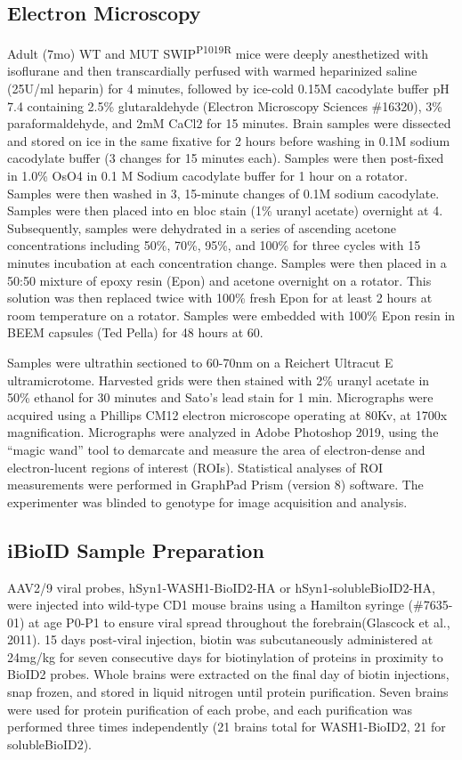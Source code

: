 \subsection{Electron Microscopy}

Adult (7mo) WT and MUT SWIP\textsuperscript{P1019R} mice were deeply
anesthetized with isoflurane and then transcardially perfused with warmed
heparinized saline (25U/ml heparin) for 4 minutes, followed by ice-cold 0.15M
cacodylate buffer pH 7.4 containing 2.5\% glutaraldehyde (Electron Microscopy
Sciences \#16320), 3\% paraformaldehyde, and 2mM CaCl2 for 15 minutes. Brain
samples were dissected and stored on ice in the same fixative for 2 hours before
washing in 0.1M sodium cacodylate buffer (3 changes for 15 minutes each).
Samples were then post-fixed in 1.0\% OsO4 in 0.1 M Sodium cacodylate buffer for
1 hour on a rotator. Samples were then washed in 3, 15-minute changes of 0.1M
sodium cacodylate. Samples were then placed into en bloc stain (1\% uranyl
acetate) overnight at 4\degreeC. Subsequently, samples were dehydrated in a
series of ascending acetone concentrations including 50\%, 70\%, 95\%, and 100\%
for three cycles with 15 minutes incubation at each concentration change.
Samples were then placed in a 50:50 mixture of epoxy resin (Epon) and acetone
overnight on a rotator. This solution was then replaced twice with 100\% fresh
Epon for at least 2 hours at room temperature on a rotator. Samples were
embedded with 100\% Epon resin in BEEM capsules (Ted Pella) for 48 hours at
60\degreeC.

Samples were ultrathin sectioned to 60-70nm on a Reichert
Ultracut E ultramicrotome. Harvested grids were then stained with 2\% uranyl
acetate in 50\% ethanol for 30 minutes and Sato’s lead stain for 1 min.
Micrographs were acquired using a Phillips CM12 electron microscope operating at
80Kv, at 1700x magnification. Micrographs were analyzed in Adobe Photoshop 2019,
using the “magic wand” tool to demarcate and measure the area of electron-dense
and electron-lucent regions of interest (ROIs). Statistical analyses of ROI
measurements were performed in GraphPad Prism (version 8) software. The
experimenter was blinded to genotype for image acquisition and analysis. 

\subsection{iBioID Sample Preparation}

AAV2/9 viral probes, hSyn1-WASH1-BioID2-HA or hSyn1-solubleBioID2-HA, were
injected into wild-type CD1 mouse brains using a Hamilton syringe (\#7635-01) at
age P0-P1 to ensure viral spread throughout the forebrain(Glascock et al.,
2011). 15 days post-viral injection, biotin was subcutaneously administered at
24mg/kg for seven consecutive days for biotinylation of proteins in proximity to
BioID2 probes. Whole brains were extracted on the final day of biotin
injections, snap frozen, and stored in liquid nitrogen until protein
purification. Seven brains were used for protein purification of each probe, and
each purification was performed three times independently (21 brains total for
WASH1-BioID2, 21 for solubleBioID2).

